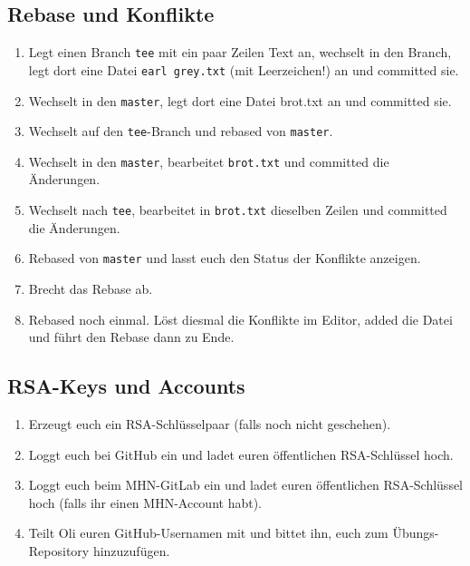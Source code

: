 \documentclass[a4paper,12pt]{scrartcl}
\begin{document}
\subsection{Rebase und Konflikte}
\begin{enumerate}
  \item Legt einen Branch \texttt{tee} mit ein paar Zeilen Text an, wechselt in den Branch, legt dort eine Datei \texttt{earl grey.txt} (mit Leerzeichen!) an und committed sie.
  \item Wechselt in den \texttt{master}, legt dort eine Datei {brot.txt} an und committed sie.
  \item Wechselt auf den \texttt{tee}-Branch und rebased von \texttt{master}.
  \item Wechselt in den \texttt{master}, bearbeitet \texttt{brot.txt} und committed die Änderungen.
  \item Wechselt nach \texttt{tee}, bearbeitet in \texttt{brot.txt} dieselben Zeilen und committed die Änderungen.
  \item Rebased von \texttt{master} und lasst euch den Status der Konflikte anzeigen.
  \item Brecht das Rebase ab.
  \item Rebased noch einmal. Löst diesmal die Konflikte im Editor, added die Datei und führt den Rebase dann zu Ende.
\end{enumerate}


\subsection{RSA-Keys und Accounts}
\begin{enumerate}
  \item Erzeugt euch ein RSA-Schlüsselpaar (falls noch nicht geschehen).
  \item Loggt euch bei GitHub ein und ladet euren öffentlichen RSA-Schlüssel hoch.
  \item Loggt euch beim MHN-GitLab ein und ladet euren öffentlichen RSA-Schlüssel hoch (falls ihr einen MHN-Account habt).
  \item Teilt Oli euren GitHub-Usernamen mit und bittet ihn, euch zum Übungs-Repository hinzuzufügen.
\end{enumerate}
\end{document}
